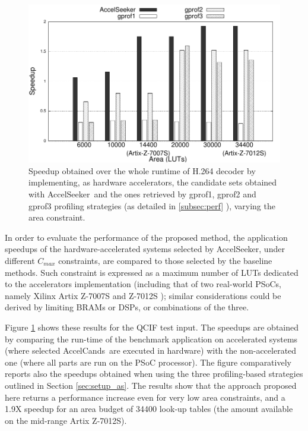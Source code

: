 \documentclass[]{usiinfthesis}
\newcommand{\aseeker}{{AccelSeeker}}
\newcommand{\candidates}{{AccelCand}s}
\begin{document}
   \begin{figure}[!t]
  \centering
  \includegraphics[width=0.8\linewidth]{figs/h264_speedup.pdf}
  \caption{Speedup obtained over the whole runtime of H.264 decoder by implementing, as hardware accelerators, the candidate sets
  obtained with \aseeker\ and the ones retrieved by gprof1, gprof2 and gprof3 profiling  strategies (as detailed in \ref{subsec:perf} ), varying the area constraint.}
  \label{fig:speedups}
\end{figure}

In order to evaluate the performance of the proposed method, the
application speedups of the hardware-accelerated systems selected by
\aseeker, under different
$C_{max}$ constraints, are compared to those selected by the baseline methods.  
Such constraint is expressed as a maximum number
of LUTs dedicated to the accelerators implementation (including that
of two real-world PSoCs, namely Xilinx Artix Z-7007S and Z-7012S
\cite{ZynqMar17}); similar considerations could be derived by limiting BRAMs 
or DSPs, or combinations of the three.\par

Figure \ref{fig:speedups} shows these results for the QCIF test input. 
The speedups are obtained by comparing the run-time of the benchmark 
application on accelerated systems (where selected \candidates\ are 
executed in hardware) with the non-accelerated one (where all parts are 
run on the PSoC processor).
The figure comparatively
reports also the speedups obtained when using the three
profiling-based strategies outlined in Section \ref{sec:setup_as}.
The results show that the approach proposed here returns a performance increase
even for very low area constraints, and a 1.9X speedup for an area
budget of 34400 look-up tables (the amount available on the mid-range
Artix Z-7012S).\par
\end{document}
